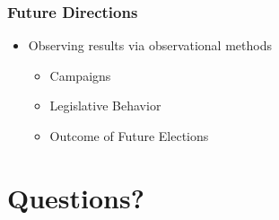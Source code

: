 \documentclass[14pt]{beamer}
\begin{document}
\begin{frame}
\frametitle{Future Directions}
\begin{itemize}
	\item Observing results via observational methods 
	\begin{itemize}
		\item Campaigns
		\item Legislative Behavior
		\item Outcome of Future Elections
	\end{itemize}
\end{itemize}
\end{frame}

\section{Questions?}
\end{document}
